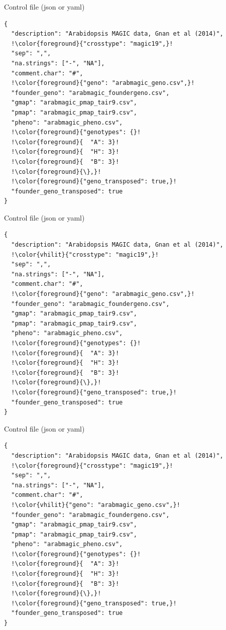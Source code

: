 \documentclass[12pt,t,aspectratio=1610]{beamer}
\begin{document}
\begin{frame}[c,fragile]{Control file (json or yaml)}
\begin{semiverbatim} \begin{lstlisting}[escapechar=!,]
{
  "description": "Arabidopsis MAGIC data, Gnan et al (2014)",
  !\color{foreground}{"crosstype": "magic19",}!
  "sep": ",",
  "na.strings": ["-", "NA"],
  "comment.char": "#",
  !\color{foreground}{"geno": "arabmagic_geno.csv",}!
  "founder_geno": "arabmagic_foundergeno.csv",
  "gmap": "arabmagic_pmap_tair9.csv",
  "pmap": "arabmagic_pmap_tair9.csv",
  "pheno": "arabmagic_pheno.csv",
  !\color{foreground}{"genotypes": {}!
  !\color{foreground}{  "A": 3}!
  !\color{foreground}{  "H": 3}!
  !\color{foreground}{  "B": 3}!
  !\color{foreground}{\},}!
  !\color{foreground}{"geno_transposed": true,}!
  "founder_geno_transposed": true
}
\end{lstlisting} \end{semiverbatim}
\end{frame}


\begin{frame}[c,fragile]{Control file (json or yaml)}
\addtocounter{framenumber}{-1}
\begin{semiverbatim} \begin{lstlisting}[escapechar=!]
{
  "description": "Arabidopsis MAGIC data, Gnan et al (2014)",
  !\color{vhilit}{"crosstype": "magic19",}!
  "sep": ",",
  "na.strings": ["-", "NA"],
  "comment.char": "#",
  !\color{foreground}{"geno": "arabmagic_geno.csv",}!
  "founder_geno": "arabmagic_foundergeno.csv",
  "gmap": "arabmagic_pmap_tair9.csv",
  "pmap": "arabmagic_pmap_tair9.csv",
  "pheno": "arabmagic_pheno.csv",
  !\color{foreground}{"genotypes": {}!
  !\color{foreground}{  "A": 3}!
  !\color{foreground}{  "H": 3}!
  !\color{foreground}{  "B": 3}!
  !\color{foreground}{\},}!
  !\color{foreground}{"geno_transposed": true,}!
  "founder_geno_transposed": true
}
\end{lstlisting} \end{semiverbatim}
\end{frame}



\begin{frame}[c,fragile]{Control file (json or yaml)}
\addtocounter{framenumber}{-1}
\begin{semiverbatim} \begin{lstlisting}[escapechar=!]
{
  "description": "Arabidopsis MAGIC data, Gnan et al (2014)",
  !\color{foreground}{"crosstype": "magic19",}!
  "sep": ",",
  "na.strings": ["-", "NA"],
  "comment.char": "#",
  !\color{vhilit}{"geno": "arabmagic_geno.csv",}!
  "founder_geno": "arabmagic_foundergeno.csv",
  "gmap": "arabmagic_pmap_tair9.csv",
  "pmap": "arabmagic_pmap_tair9.csv",
  "pheno": "arabmagic_pheno.csv",
  !\color{foreground}{"genotypes": {}!
  !\color{foreground}{  "A": 3}!
  !\color{foreground}{  "H": 3}!
  !\color{foreground}{  "B": 3}!
  !\color{foreground}{\},}!
  !\color{foreground}{"geno_transposed": true,}!
  "founder_geno_transposed": true
}
\end{lstlisting} \end{semiverbatim}
\end{frame}
\end{document}
